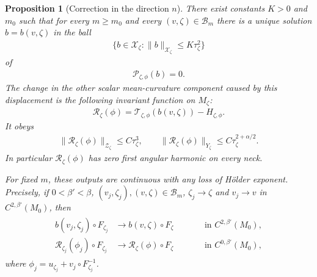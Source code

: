 \documentclass[a4paper,11pt,oneside,reqno]{amsart}
\numberwithin{equation}{section}
\newtheorem{proposition}[theorem]{Proposition}
\theoremstyle{definition}
\begin{document}
\begin{proposition}[Correction in the direction $n$]
    \label{prop:s4-transverse-elimination}
    There exist constants $K>0$ and $m_0$ such that for every
    $m\geq m_0$ and every $(v,\zeta)\in\mathcal{B}_m$ there is
    a unique solution $b=b(v,\zeta)$ in the ball
    \begin{align}
        \label{eq:s4-transverse-ball}
        \{b\in\mathcal{X}_\zeta:\|b\|_{\mathcal{X}_\zeta}
        \leq K\tau_\zeta^2\}
    \end{align}
    of
    \begin{align}
        \label{eq:s4-transverse-equation}
        \mathscr{P}_{\zeta,\phi}(b)=0.
    \end{align}
    The change in the other scalar mean-curvature component caused
    by this displacement is the following invariant function
    on $M_\zeta$:
    \begin{align}
        \label{eq:s4-feedback-definition}
        \mathcal{R}_\zeta(\phi)
        =\mathscr{T}_{\zeta,\phi}(b(v,\zeta))-H_{\zeta,\phi}.
    \end{align}
    It obeys
    \begin{align}
        \label{eq:s4-feedback-estimates}
        \|\mathcal{R}_\zeta(\phi)\|_{\mathcal{Z}_\zeta}
        \leq C\tau_\zeta^3,
        \qquad
        \|\mathcal{R}_\zeta(\phi)\|_{Y_\zeta}
        \leq C\tau_\zeta^{2+\alpha/2}.
    \end{align}
    In particular $\mathcal{R}_\zeta(\phi)$ has zero first
    angular harmonic on every neck.

    For fixed $m$, these outputs are continuous with any loss
    of H\"older exponent. Precisely, if $0<\beta'<\beta$,
    $(v_j,\zeta_j),(v,\zeta)\in\mathcal{B}_m$,
    $\zeta_j\to\zeta$ and $v_j\to v$ in
    $C^{2,\beta'}(M_0)$, then
    \begin{align}
        \label{eq:s4-transverse-continuity}
        \begin{aligned}
            b(v_j,\zeta_j)\circ F_{\zeta_j}
            &\rightarrow b(v,\zeta)\circ F_\zeta
            &&\qquad\text{in }C^{2,\beta'}(M_0),\\
            \mathcal{R}_{\zeta_j}(\phi_j)\circ F_{\zeta_j}
            &\rightarrow\mathcal{R}_\zeta(\phi)\circ F_\zeta
            &&\qquad\text{in }C^{0,\beta'}(M_0),
        \end{aligned}
    \end{align}
    where $\phi_j=u_{\zeta_j}+v_j\circ F_{\zeta_j}^{-1}$.
\end{proposition}
\end{document}
